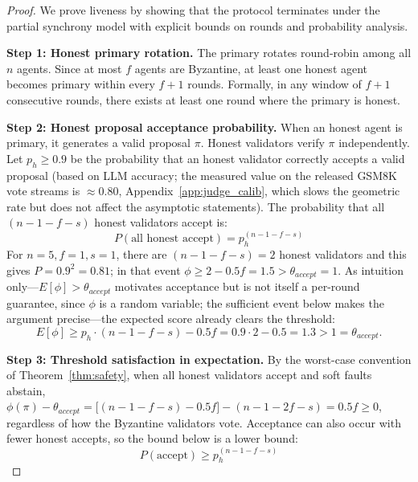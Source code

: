 \documentclass{article}
\begin{document}
\begin{proof}
We prove liveness by showing that the protocol terminates under the partial synchrony model with explicit bounds on rounds and probability analysis.

\textbf{Step 1: Honest primary rotation.}
The primary rotates round-robin among all $n$ agents. Since at most $f$ agents are Byzantine, at least one honest agent becomes primary within every $f+1$ rounds. Formally, in any window of $f+1$ consecutive rounds, there exists at least one round where the primary is honest.

\textbf{Step 2: Honest proposal acceptance probability.}
When an honest agent is primary, it generates a valid proposal $\pi$. Honest validators verify $\pi$ independently. Let $p_h \geq 0.9$ be the probability that an honest validator correctly accepts a valid proposal (based on LLM accuracy; the measured value on the released GSM8K vote streams is $\approx 0.80$, Appendix~\ref{app:judge_calib}, which slows the geometric rate but does not affect the asymptotic statements). The probability that all $(n-1-f-s)$ honest validators accept is:
\begin{equation}
    P(\text{all honest accept}) = p_h^{(n-1-f-s)}
\end{equation}
For $n=5, f=1, s=1$, there are $(n-1-f-s)=2$ honest validators and this gives $P = 0.9^2 = 0.81$; in that event $\phi \geq 2 - 0.5f = 1.5 > \theta_{accept} = 1$. As intuition only---$E[\phi] > \theta_{accept}$ motivates acceptance but is not itself a per-round guarantee, since $\phi$ is a random variable; the sufficient event below makes the argument precise---the expected score already clears the threshold:
\begin{equation}
    E[\phi] \geq p_h \cdot (n-1-f-s) - 0.5f = 0.9 \cdot 2 - 0.5 = 1.3 > 1 = \theta_{accept}.
\end{equation}

\textbf{Step 3: Threshold satisfaction in expectation.}
By the worst-case convention of Theorem~\ref{thm:safety}, when all honest validators accept and soft faults abstain, $\phi(\pi) - \theta_{accept} = \bigl[(n{-}1{-}f{-}s) - 0.5f\bigr] - (n{-}1{-}2f{-}s) = 0.5f \geq 0$, regardless of how the Byzantine validators vote. Acceptance can also occur with fewer honest accepts, so the bound below is a lower bound:
\begin{equation}
    P(\text{accept}) \geq p_h^{(n-1-f-s)}
\end{equation}


\end{proof}
\end{document}
